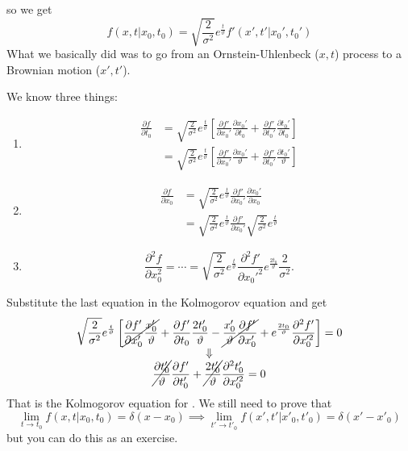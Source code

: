 \documentclass[12pt]{report}
\begin{document}
so we get
\begin{equation*}
	f(x,t|x_{0},t_{0})=\sqrt{\frac{2}{\sigma^{2}}}e^{\frac{t}{\vartheta}}f'(x',t'|x_{0}',t_{0}')
\end{equation*}
What we basically did was to go from an Ornstein-Uhlenbeck ($x,t$) process to a Brownian motion ($x',t'$).
\begin{fancyproof}
	We know three things:
	\begin{enumerate}
		\item \begin{align*}
			\frac{\partial f}{\partial t_{0}}&=\sqrt{\frac{2}{\sigma^{2}}}e^{\frac{t}{\vartheta}}\left[\frac{\partial f'}{\partial x_{0}'}\frac{\partial x_{0}'}{\partial t_{0}}+\frac{\partial f'}{\partial t_{0}'}\frac{\partial t_{0}'}{\partial t_{0}}\right]\\
			&=\sqrt{\frac{2}{\sigma^{2}}}e^{\frac{t}{\vartheta}}\left[\frac{\partial f'}{\partial x_{0}'}\frac{\partial x_{0}'}{\vartheta}+\frac{\partial f'}{\partial t_{0}'}\frac{\partial t_{0}'}{\vartheta}\right]
		\end{align*}
		\item \begin{align*}
			\frac{\partial f}{\partial x_{0}}&=\sqrt{\frac{2}{\sigma^{2}}}e^{\frac{t}{\vartheta}}\frac{\partial f'}{\partial x_{0}'}\frac{\partial x_{0}'}{\partial x_{0}}\\
			&=\sqrt{\frac{2}{\sigma^{2}}}e^{\frac{t}{\vartheta}}\frac{\partial f'}{\partial x_{0}'}\sqrt{\frac{2}{\sigma^{2}}}e^{\frac{t}{\vartheta}}
		\end{align*}
		\item \begin{equation*}
			\frac{\partial^{2}f}{\partial x_{0}^{2}}=\cdots=\sqrt{\frac{2}{\sigma^{2}}}e^{\frac{t}{\vartheta}}\frac{\partial^{2}f'}{\partial x_{0}'^{2}}e^{\frac{2t_{0}}{\vartheta}}\frac{2}{\sigma^{2}}.
		\end{equation*}
	\end{enumerate}
	Substitute the last equation in the Kolmogorov equation and get
	\begin{equation*}
		\begin{array}{>{\displaystyle}c}
			\sqrt{\frac{2}{\sigma^{2}}}e^{\frac{t}{\vartheta}}\left[\cancel{\frac{\partial f'}{\partial x_{0}'}\frac{x_{0}'}{\vartheta}}+\frac{\partial f'}{\partial t_{0}}\frac{2t'_{0}}{\vartheta}-\cancel{\frac{x'_{0}}{\vartheta}\frac{\partial f'}{\partial x_{0}'}}+e^{\frac{2t_{0}}{\vartheta}}\frac{\partial^{2}f'}{\partial x_{0}'^{2}}\right]=0\\
			\Downarrow\\
			\cancel{\frac{\partial t'_{0}}{\vartheta}}\frac{\partial f'}{\partial t'_{0}}+\cancel{\frac{2t'_{0}}{\vartheta}}\frac{\partial^{2}t'_{0}}{\partial x_{0}'^{2}}=0
		\end{array}
	\end{equation*}
	That is the Kolmogorov equation for \bwm. We still need to prove that
	\begin{equation*}
		\lim_{t\to t_0}f(x,t|x_{0},t_{0})=\delta(x-x_{0})\implies\lim_{t'\to t'_{0}}f(x',t'|x'_{0},t'_{0})=\delta(x'-x'_{0})
	\end{equation*}
	but you can do this as an exercise. \faHeart
\end{fancyproof}
\end{document}
